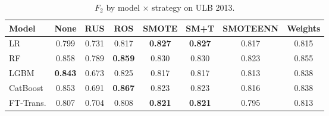 \begin{table}[H]
\centering
\caption{$F_2$ by model $\times$ strategy on ULB 2013.}
\label{tab:factorial_ulb_f2}
\begin{tabular}{l c c c c c c c}
\toprule
Model & None & RUS & ROS & SMOTE & SM+T & SMOTEENN & Weights \\
\midrule
LR         & 0.799 & 0.731 & 0.817 & \textbf{0.827} & \textbf{0.827} & 0.817 & 0.815 \\
RF         & 0.858 & 0.789 & \textbf{0.859} & 0.830 & 0.830 & 0.823 & 0.855 \\
LGBM       & \textbf{0.843} & 0.673 & 0.825 & 0.817 & 0.817 & 0.813 & 0.838 \\
CatBoost   & 0.853 & 0.691 & \textbf{0.867} & 0.823 & 0.823 & 0.816 & 0.838 \\
FT-Trans.  & 0.807 & 0.704 & 0.808 & \textbf{0.821} & \textbf{0.821} & 0.795 & 0.813 \\
\bottomrule
\end{tabular}
\end{table}